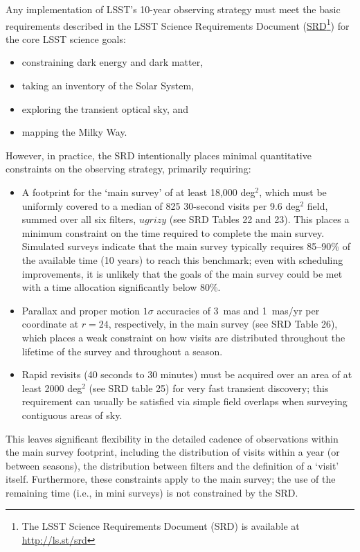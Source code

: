 \documentclass[DM,toc,usenatbib]{lsstdoc}
\begin{document}
Any implementation of LSST's 10-year observing strategy must meet the basic requirements described in the 
LSST Science Requirements Document (\href{http://ls.st/srd}{SRD}\footnote{The LSST Science 
Requirements Document (SRD) is available at \href{http://ls.st/srd}{http://ls.st/srd}})
for the core LSST science goals:
\begin{itemize}
\item constraining dark energy and dark matter,
\item taking an inventory of the Solar System,
\item exploring the transient optical sky, and
\item mapping the Milky Way.
\end{itemize}
However, in practice, the SRD intentionally places minimal quantitative constraints on the observing strategy,
primarily requiring:
\begin{itemize} 
\item A footprint for the `main survey' of at least 18,000 deg$^2$, which must be uniformly covered to 
a median of 825 30-second visits per 9.6 deg$^2$ field, summed over all six filters, $ugrizy$ (see SRD 
Tables 22 and 23). This places a minimum constraint on the time required to complete 
the main survey. Simulated surveys indicate that the main survey typically requires 85--90\% 
of the available time (10 years) to reach this benchmark; even with scheduling improvements, it is unlikely 
that the goals of the main survey could be met with a time allocation significantly below 80\%. 
\item Parallax and proper motion $1\sigma$ accuracies of 3~mas and 1~mas/yr per coordinate at $r=24$, 
respectively, in the main survey (see SRD Table 26), which places
a weak constraint on how visits are distributed throughout the lifetime of the survey and throughout a season.
\item Rapid revisits (40 seconds to 30 minutes) must be acquired over an area of at least 2000 deg$^2$ (see SRD table 25) for
very fast transient discovery; this requirement can usually be satisfied via simple field overlaps when surveying contiguous areas of sky. 
\end{itemize}
This leaves significant flexibility in the detailed cadence of observations within
the main survey footprint, including the distribution of visits within a year (or between seasons), the distribution between filters and 
the definition of a `visit' itself. Furthermore, these constraints apply to the main survey; the use of the 
remaining time (i.e., in mini surveys) is not constrained by the SRD.
\end{document}
